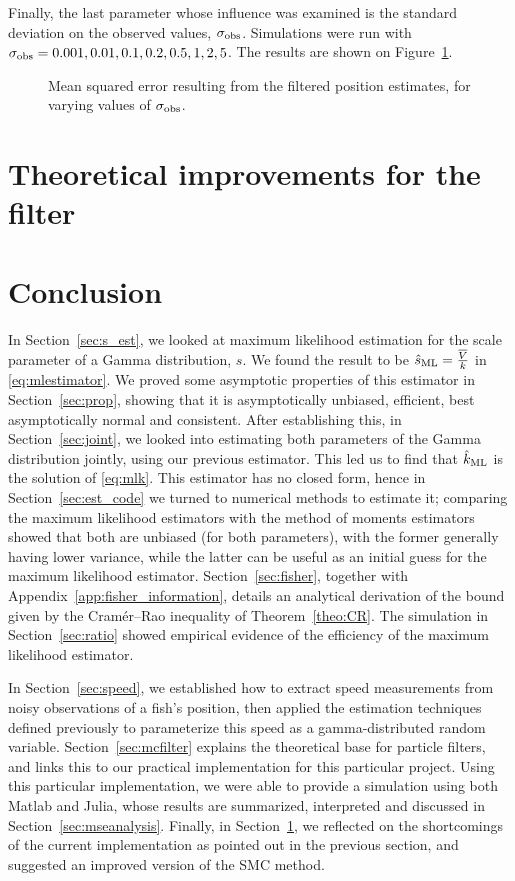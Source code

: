 \documentclass[final]{aomart}
\newtheorem[{}\it]{thm}{Theorem}[section]
\theoremstyle{definition}
\newtheorem*[{}\it]{notation}{Notation}
\numberwithin{equation}{section}
\begin{document}
Finally, the last parameter whose influence was examined is the standard deviation on the observed values, \(\sigma_\textnormal{obs}\).
Simulations were run with \(\sigma_{\textnormal{obs}} = 0.001, 0.01, 0.1, 0.2, 0.5, 1, 2, 5\).
The results are shown on Figure~\ref{fig:sigma_obs}.
\begin{figure}[!htbp]
	\centering
	\scalebox{0.75}{}
	\caption{Mean squared error resulting from the filtered position estimates, for varying values of \(\sigma_\textnormal{obs}\).}
	\label{fig:sigma_obs}
\end{figure}

\section{Theoretical improvements for the filter}
\label{sec:improvements}

\section{Conclusion}
In Section~\ref{sec:s_est}, we looked at maximum likelihood estimation for the scale parameter of a Gamma distribution, \(s\).
We found the result to be \(\hat{s}_{\textnormal{ML}} = \frac{\overline{V}}{k}\) in \eqref{eq:mlestimator}.
We proved some asymptotic properties of this estimator in Section~\ref{sec:prop}, showing that it is asymptotically unbiased, efficient, best asymptotically normal and consistent.
After establishing this, in Section~\ref{sec:joint}, we looked into estimating both parameters of the Gamma distribution jointly, using our previous estimator.
This led us to find that \(\hat{k}_{\textnormal{ML}}\) is the solution of \eqref{eq:mlk}.
This estimator has no closed form, hence in Section~\ref{sec:est_code} we turned to numerical methods to estimate it; comparing the maximum likelihood estimators with the method of moments estimators showed that both are unbiased (for both parameters), with the former generally having lower variance, while the latter can be useful as an initial guess for the maximum likelihood estimator.
Section~\ref{sec:fisher}, together with Appendix~\ref{app:fisher_information}, details an analytical derivation of the bound given by the Cramér--Rao inequality of Theorem~\ref{theo:CR}.
The simulation in Section~\ref{sec:ratio} showed empirical evidence of the efficiency of the maximum likelihood estimator.

In Section~\ref{sec:speed}, we established how to extract speed measurements from noisy observations of a fish's position, then applied the estimation techniques defined previously to parameterize this speed as a gamma-distributed random variable.
Section~\ref{sec:mcfilter} explains the theoretical base for particle filters, and links this to our practical implementation for this particular project.
Using this particular implementation, we were able to provide a simulation using both Matlab and Julia, whose results are summarized, interpreted and discussed in Section~\ref{sec:mseanalysis}.
Finally, in Section~\ref{sec:improvements}, we reflected on the shortcomings of the current implementation as pointed out in the previous section, and suggested an improved version of the SMC method.
\end{document}

